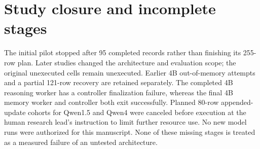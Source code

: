 \documentclass[11pt,letterpaper]{article}
\begin{document}
\section{Study closure and incomplete stages}
The initial pilot stopped after 95 completed records rather than finishing its 255-row plan. Later studies changed the architecture and evaluation scope; the original unexecuted cells remain unexecuted. Earlier 4B out-of-memory attempts and a partial 121-row recovery are retained separately. The completed 4B reasoning worker has a controller finalization failure, whereas the final 4B memory worker and controller both exit successfully. Planned 80-row appended-update cohorts for Qwen1.5 and Qwen4 were canceled before execution at the human research lead's instruction to limit further resource use. No new model runs were authorized for this manuscript. None of these missing stages is treated as a measured failure of an untested architecture.
\end{document}
